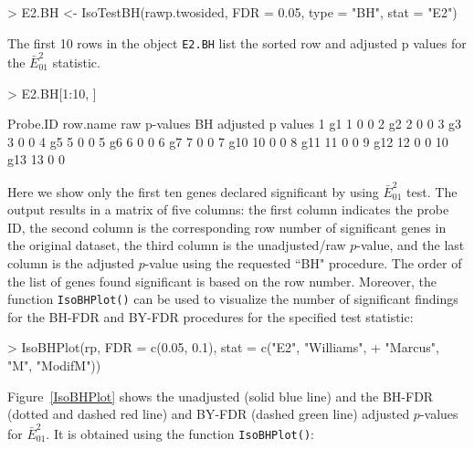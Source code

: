 \documentclass[10pt]{mybook4}
\begin{document}
\begin{Schunk}
\begin{Sinput}
> E2.BH <- IsoTestBH(rawp.twosided, FDR = 0.05, type = "BH", stat = "E2")
\end{Sinput}
\end{Schunk}

The first 10 rows in the object \texttt{E2.BH} list the sorted row and adjusted p values for the $\bar{E}^{2}_{01}$ statistic.

\begin{Schunk}
\begin{Sinput}
> E2.BH[1:10, ]
\end{Sinput}
\begin{Soutput}
   Probe.ID row.name raw p-values BH adjusted p values
1        g1        1            0                    0
2        g2        2            0                    0
3        g3        3            0                    0
4        g5        5            0                    0
5        g6        6            0                    0
6        g7        7            0                    0
7       g10       10            0                    0
8       g11       11            0                    0
9       g12       12            0                    0
10      g13       13            0                    0
\end{Soutput}
\end{Schunk}

Here we show only the first ten genes declared significant by using
$\bar{E}^{2}_{01}$ test. The output results in a matrix of five
columns: the first column indicates the probe ID, the second column
is the corresponding row number of significant genes in the original
dataset, the third column is the unadjusted/raw $p$-value, and the
last column is the adjusted $p$-value using the requested ``BH"
procedure. The order of the list of genes found significant is based
on the row number. Moreover, the function \texttt{IsoBHPlot()} can
be used to visualize the number of significant findings for the
BH-FDR and BY-FDR procedures for the specified test statistic:

\begin{Schunk}
\begin{Sinput}
> IsoBHPlot(rp, FDR = c(0.05, 0.1), stat = c("E2", "Williams", 
+     "Marcus", "M", "ModifM"))
\end{Sinput}
\end{Schunk}

Figure~\ref{IsoBHPlot} shows the unadjusted (solid blue line) and
the BH-FDR (dotted and dashed red line) and BY-FDR (dashed green
line) adjusted $p$-values for $\bar{E}^2_{01}$. It is obtained using
the function \texttt{IsoBHPlot()}:
\end{document}
